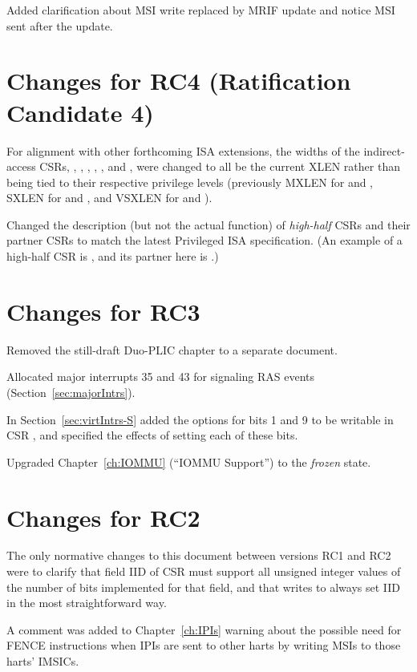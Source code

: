 Added clarification about MSI write replaced by MRIF update and
notice MSI sent after the update.

\section*{Changes for RC4 (Ratification Candidate 4)}

For alignment with other forthcoming {\RISCV} ISA extensions,
the widths of the indirect-access CSRs, , ,
, , , and , were
changed to all be the current XLEN rather than being tied to
their respective privilege levels (previously MXLEN for
 and , SXLEN for  and ,
and VSXLEN for  and ).

Changed the description (but not the actual function)
of \emph{high-half} CSRs and their partner CSRs
to match the latest {\RISCV} Privileged ISA specification.
(An example of a high-half CSR is ,
and its partner here is .)

\section*{Changes for RC3}

Removed the still-draft Duo-PLIC chapter to a separate document.

Allocated major interrupts 35 and 43 for signaling RAS events
(Section~\ref{sec:majorIntrs}).

In Section~\ref{sec:virtIntrs-S} added the options
for bits 1 and 9 to be writable in CSR ,
and specified the effects of setting each of these bits.

Upgraded Chapter~\ref{ch:IOMMU} (``IOMMU Support'')
to the \emph{frozen} state.

\section*{Changes for RC2}

The only normative changes to this document
between versions RC1 and RC2 were to clarify that
field IID of CSR  must support all
unsigned integer values of the number of bits implemented
for that field, and that writes to 
always set IID in the most straightforward way.

A comment was added to Chapter~\ref{ch:IPIs} warning about
the possible need for FENCE instructions when IPIs are
sent to other harts by writing MSIs to those harts' IMSICs.

